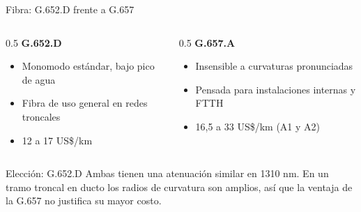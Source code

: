 \begin{frame}{Fibra: G.652.D frente a G.657}
  \begin{columns}[T]
    \begin{column}{0.5\textwidth}
      \textbf{G.652.D}
      \begin{itemize}
        \item Monomodo estándar, bajo pico de agua
        \item Fibra de uso general en redes troncales
        \item 12 a 17 US\$/km
      \end{itemize}
    \end{column}
    \begin{column}{0.5\textwidth}
      \textbf{G.657.A}
      \begin{itemize}
        \item Insensible a curvaturas pronunciadas
        \item Pensada para instalaciones internas y FTTH
        \item 16,5 a 33 US\$/km (A1 y A2)
      \end{itemize}
    \end{column}
  \end{columns}
  \vspace{0.4cm}
  \begin{block}{Elección: G.652.D}
    Ambas tienen una atenuación similar en 1310 nm. En un tramo troncal en ducto los radios de curvatura son amplios, así que la ventaja de la G.657 no justifica su mayor costo.
  \end{block}
\end{frame}

